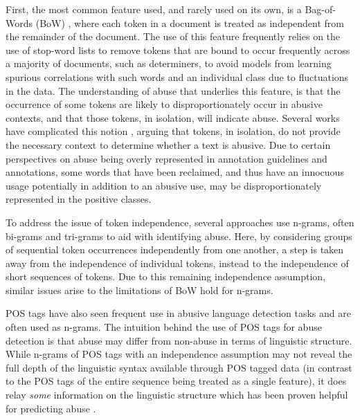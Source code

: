 First, the most common feature used, and rarely used on its own, is a Bag-of-Words (BoW) \citep{Fortuna:2018,Davidson:2017}, where each token in a document is treated as independent from the remainder of the document. 
The use of this feature frequently relies on the use of stop-word lists to remove tokens that are bound to occur frequently across a majority of documents, such as determiners, to avoid models from learning spurious correlations with such words and an individual class due to fluctuations in the data. 
The understanding of abuse that underlies this feature, is that the occurrence of some tokens are likely to disproportionately occur in abusive contexts, and that those tokens, in isolation, will indicate abuse. 
Several works have complicated this notion \citep[e.g.]{Waseem:2018,Davidson:2019}, arguing that tokens, in isolation, do not provide the necessary context to determine whether a text is abusive.
Due to certain perspectives on abuse being overly represented \citep{Waseem:2016} in annotation guidelines and annotations, some words that have been reclaimed, and thus have an innocuous usage potentially in addition to an abusive use, may be disproportionately represented in the positive classes.

To address the issue of token independence, several approaches use n-grams, often bi-grams \citep{Waseem:2016} and tri-grams \citep{Davidson:2017} to aid with identifying abuse. 
Here, by considering groups of sequential token occurrences independently from one another, a step is taken away from the independence of individual tokens, instead to the independence of short sequences of tokens. 
Due to this remaining independence assumption, similar issues arise to the limitations of BoW hold for n-grams.

POS tags have also seen frequent use in abusive language detection tasks \citep{Fortuna:2018} and are often used as n-grams. 
The intuition behind the use of POS tags for abuse detection is that abuse may differ from non-abuse in terms of linguistic structure. 
While n-grams of POS tags with an independence assumption may not reveal the full depth of the linguistic syntax available through POS tagged data (in contrast to the POS tags of the entire sequence being treated as a single feature), it does relay \textit{some} information on the linguistic structure which has been proven helpful for predicting abuse \citep{Fortuna:2018}.

